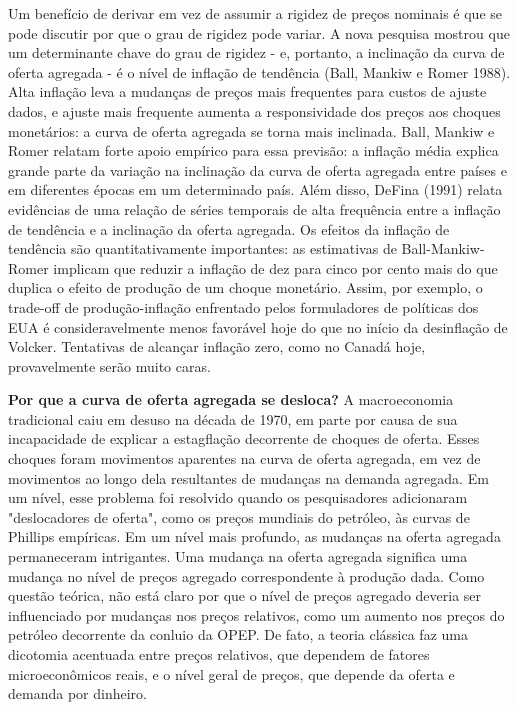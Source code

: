 \documentclass[12pt]{article}
\begin{document}
Um benefício de derivar em vez de assumir a rigidez de preços nominais é que se pode discutir por que o grau de rigidez pode variar. A nova pesquisa mostrou que um determinante chave do grau de rigidez - e, portanto, a inclinação da curva de oferta agregada - é o nível de inflação de tendência (Ball, Mankiw e Romer 1988). Alta inflação leva a mudanças de preços mais frequentes para custos de ajuste dados, e ajuste mais frequente aumenta a responsividade dos preços aos choques monetários: a curva de oferta agregada se torna mais inclinada. Ball, Mankiw e Romer relatam forte apoio empírico para essa previsão: a inflação média explica grande parte da variação na inclinação da curva de oferta agregada entre países e em diferentes épocas em um determinado país. Além disso, DeFina (1991) relata evidências de uma relação de séries temporais de alta frequência entre a inflação de tendência e a inclinação da oferta agregada. Os efeitos da inflação de tendência são quantitativamente importantes: as estimativas de Ball-Mankiw-Romer implicam que reduzir a inflação de dez para cinco por cento mais do que duplica o efeito de produção de um choque monetário. Assim, por exemplo, o trade-off de produção-inflação enfrentado pelos formuladores de políticas dos EUA é consideravelmente menos favorável hoje do que no início da desinflação de Volcker. Tentativas de alcançar inflação zero, como no Canadá hoje, provavelmente serão muito caras.

\textbf{Por que a curva de oferta agregada se desloca?}
A macroeconomia tradicional caiu em desuso na década de 1970, em parte por causa de sua incapacidade de explicar a estagflação decorrente de choques de oferta. Esses choques foram movimentos aparentes na curva de oferta agregada, em vez de movimentos ao longo dela resultantes de mudanças na demanda agregada. Em um nível, esse problema foi resolvido quando os pesquisadores adicionaram "deslocadores de oferta", como os preços mundiais do petróleo, às curvas de Phillips empíricas. Em um nível mais profundo, as mudanças na oferta agregada permaneceram intrigantes. Uma mudança na oferta agregada significa uma mudança no nível de preços agregado correspondente à produção dada. Como questão teórica, não está claro por que o nível de preços agregado deveria ser influenciado por mudanças nos preços relativos, como um aumento nos preços do petróleo decorrente da conluio da OPEP. De fato, a teoria clássica faz uma dicotomia acentuada entre preços relativos, que dependem de fatores microeconômicos reais, e o nível geral de preços, que depende da oferta e demanda por dinheiro.
\end{document}
